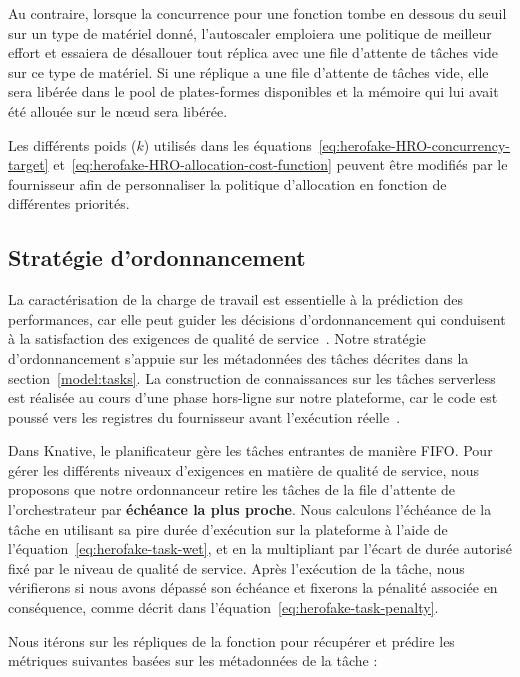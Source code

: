Au contraire, lorsque la concurrence pour une fonction tombe en dessous du seuil sur un type de matériel donné, l'autoscaler emploiera une politique de meilleur effort et essaiera de désallouer tout réplica avec une file d'attente de tâches vide sur ce type de matériel. Si une réplique a une file d'attente de tâches vide, elle sera libérée dans le pool de plates-formes disponibles et la mémoire qui lui avait été allouée sur le nœud sera libérée.

Les différents poids ($k$) utilisés dans les équations~\ref{eq:herofake-HRO-concurrency-target} et~\ref{eq:herofake-HRO-allocation-cost-function} peuvent être modifiés par le fournisseur afin de personnaliser la politique d'allocation en fonction de différentes priorités.

\subsection{Stratégie d'ordonnancement} \label{section:herofake-scheduling-strategy}

La caractérisation de la charge de travail est essentielle à la prédiction des performances, car elle peut guider les décisions d'ordonnancement qui conduisent à la satisfaction des exigences de qualité de service~\cite{mampageHolisticViewResource2022}. Notre stratégie d'ordonnancement s'appuie sur les métadonnées des tâches décrites dans la section~\ref{model:tasks}. La construction de connaissances sur les tâches serverless est réalisée au cours d'une phase hors-ligne sur notre plateforme, car le code est poussé vers les registres du fournisseur avant l'exécution réelle~\cite{shahradServerlessWildCharacterizing}.

Dans Knative, le planificateur gère les tâches entrantes de manière FIFO. Pour gérer les différents niveaux d'exigences en matière de qualité de service, nous proposons que notre ordonnanceur retire les tâches de la file d'attente de l'orchestrateur par \textbf{échéance la plus proche}. Nous calculons l'échéance de la tâche en utilisant sa pire durée d'exécution sur la plateforme à l'aide de l'équation~\ref{eq:herofake-task-wet}, et en la multipliant par l'écart de durée autorisé fixé par le niveau de qualité de service. Après l'exécution de la tâche, nous vérifierons si nous avons dépassé son échéance et fixerons la pénalité associée en conséquence, comme décrit dans l'équation~\ref{eq:herofake-task-penalty}. 

Nous itérons sur les répliques de la fonction pour récupérer et prédire les métriques suivantes basées sur les métadonnées de la tâche :

